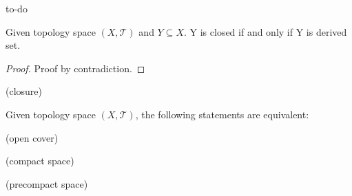 \begin{example}
to-do
\end{example}

\begin{theorem}
Given topology space $(X, \mathcal{T})$ and $Y \subseteq X$. Y is closed if and only if Y is derived set. 
\end{theorem}

\begin{proof}
Proof by contradiction. 
\end{proof}

\begin{definition}
(closure)
\end{definition}

\begin{theorem}
Given topology space $(X, \mathcal{T})$, the following statements are equivalent: 
\end{theorem}

\begin{definition}
(open cover)
\end{definition}

\begin{definition}
(compact space)
\end{definition}

\begin{definition}
(precompact space)
\end{definition}



















